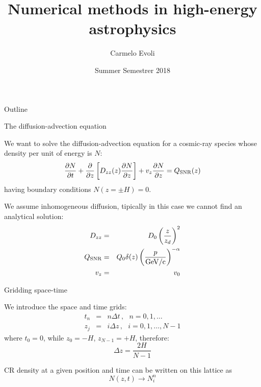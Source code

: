 \documentclass[9pt]{beamer}
\author[C.~Evoli]{Carmelo Evoli}
\institute[GSSI]{Gran Sasso Science Institute}
\title[Numerical methods in HEA]{Numerical methods in high-energy astrophysics}
\date[2018]{Summer Semestrer 2018}
\begin{document}
\begin{frame}
\titlepage
\end{frame}

\begin{frame}{Outline}
\tableofcontents
\end{frame}

\begin{frame}{The diffusion-advection equation}

We want to solve the diffusion-advection equation for a cosmic-ray species whose density per unit of energy is $N$:
%
\begin{equation*}
\frac{\partial N}{\partial t} 
+\frac{\partial}{\partial z} \left[ D_{zz}(z) \frac{\partial N}{\partial z} \right]
+v_z \frac{\partial N}{\partial z}
= Q_{\rm SNR}(z)
\end{equation*}
%
having boundary conditions $N(z = \pm H) = 0$.

We assume {\color{orange}inhomogeneous} diffusion, tipically in this case we cannot find an analytical solution:
%
\begin{eqnarray*}
D_{zz} & = & D_0 \left( \frac{z}{z_d} \right)^{2} \\
Q_{\rm SNR} & = & Q_0 \delta(z) \left( \frac{p}{\rm GeV/c} \right)^{-\alpha} \\
v_z & = & v_0
\end{eqnarray*}
\end{frame}

\begin{frame}{Gridding space-time}

We introduce the space and time grids: 
%
\begin{eqnarray*}
t_n & = & n \Delta t \, , \,\,\,\,  n = 0, 1, \dots  \\ 
z_j & = & i \Delta z \, , \,\,\,\,  i = 0, 1, \dots, N-1
\end{eqnarray*}
%
where
%
$t_0 = 0$, while $z_0 = -H$, $z_{N-1} = +H$, therefore:
%
\begin{equation*}
\Delta z = \frac{2H}{N - 1}
\end{equation*}

CR density at a given position and time can be written on this lattice as
%
\begin{equation*}
N(z, t) \rightarrow N_i^n
\end{equation*}

\end{frame}
\end{document}
